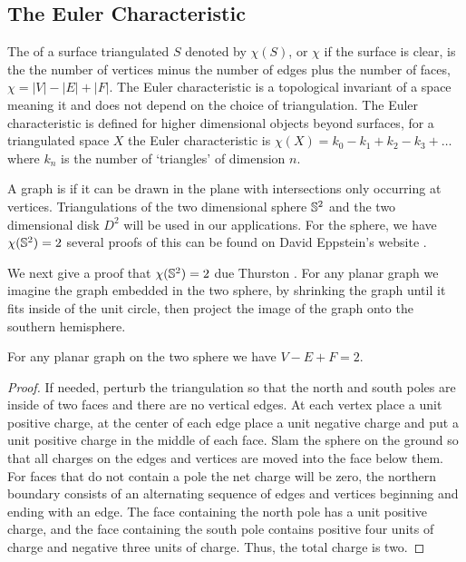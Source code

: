 \subsection{The Euler Characteristic}

The  of a surface triangulated $S$ denoted by $\chi(S)$, or $\chi$
 if the surface is clear,  is the 
the number of vertices minus the number of edges plus  the number of faces, $\chi=|V|-|E|+|F|.$
The Euler characteristic is a topological invariant of a space meaning it
and does not depend on the choice of triangulation.
The Euler characteristic is defined for higher dimensional objects beyond surfaces,
 for a triangulated space $X$ the Euler characteristic is 
$\chi(X)=k_0-k_1+k_2-k_3+\ldots$ where $k_n$ is the number of `triangles' of dimension $n.$



A  graph  is  if it can be drawn in the plane with intersections only occurring
at vertices.
Triangulations of the two dimensional sphere $\mathbb{S}^2$ and the two dimensional disk $D^2$ 
will be used in our applications.
For the sphere, we have $\chi(\mathbb{S}^2)=2$ 
several proofs of this can be found on David Eppstein's website \cite{eppstein-proofs}.




We next give a proof that $\chi(\mathbb{S}^2)=2$ due Thurston \cite{thurston}. 
For any planar graph we imagine the graph embedded in the two sphere, by
shrinking the graph until it fits inside of the unit circle, then project the image of the graph
onto the southern hemisphere.  

\begin{theorem}\label{thm:euler}
For any planar graph on the two sphere we have $V-E+F=2.$
\end{theorem}

\begin{proof}
If needed, perturb the triangulation so that the north and south poles are 
inside of  two faces and there are no vertical edges. At each vertex place a unit positive
charge, at the center of each edge place a unit negative charge and put a unit positive
charge in the middle of each face. Slam the sphere on the ground so that all charges
on the edges and vertices are moved into the face below them. For faces that do not contain a pole
the net charge will be zero, the northern boundary consists of an alternating sequence
of edges and vertices  beginning  and ending with an edge.
The face containing the north pole has a unit positive charge, and the face containing the south
pole contains positive four units of charge and negative three units of charge.
Thus, the total charge is two.
\end{proof}

